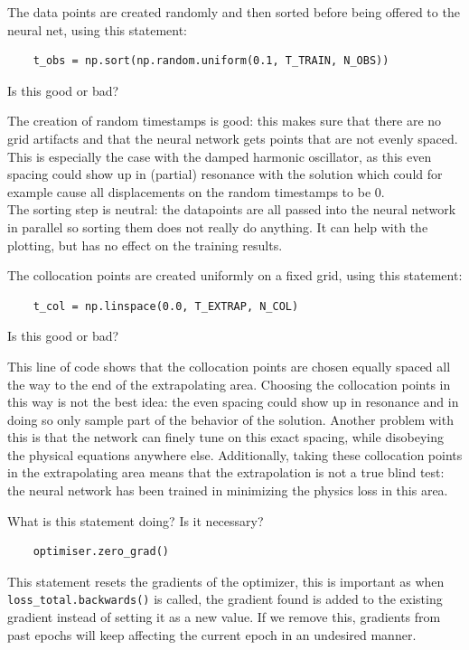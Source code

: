\documentclass[12pt, a4paper]{report}
\begin{document}
\begin{tcolorbox}[title=Code Question 3,sharp corners, colframe=black, colback=white]
    The data points are created randomly and then sorted before being offered to the neural net, using this statement:
    \begin{verbatim}
    t_obs = np.sort(np.random.uniform(0.1, T_TRAIN, N_OBS))
    \end{verbatim}
    Is this good or bad?
\end{tcolorbox}
The creation of random timestamps is good: this makes sure that there are no grid artifacts and that the neural network gets points that are not evenly spaced. This is especially the case with the damped harmonic oscillator, as this even spacing could show up in (partial) resonance with the solution which could for example cause all displacements on the random timestamps to be 0.\\
The sorting step is neutral: the datapoints are all passed into the neural network in parallel so sorting them does not really do anything. It can help with the plotting, but has no effect on the training results.\\

\begin{tcolorbox}[title=Code Question 4,sharp corners, colframe=black, colback=white]
    The collocation points are created uniformly on a fixed grid, using this statement:
    \begin{verbatim}
    t_col = np.linspace(0.0, T_EXTRAP, N_COL)
    \end{verbatim}
    Is this good or bad?
\end{tcolorbox}
This line of code shows that the collocation points are chosen equally spaced all the way to the end of the extrapolating area. Choosing the collocation points in this way is not the best idea: the even spacing could show up in resonance and in doing so only sample part of the behavior of the solution. Another problem with this is that the network can finely tune on this exact spacing, while disobeying the physical equations anywhere else. Additionally, taking these collocation points in the extrapolating area means that the extrapolation is not a true blind test: the neural network has been trained in minimizing the physics loss in this area.\\

\begin{tcolorbox}[title=Code Question 5,sharp corners, colframe=black, colback=white]
    What is this statement doing? Is it necessary?
    \begin{verbatim}
    optimiser.zero_grad()
    \end{verbatim}
\end{tcolorbox}
This statement resets the gradients of the optimizer, this is important as when \verb|loss_total.backwards()| is called, the gradient found is added to the existing gradient instead of setting it as a new value. If we remove this, gradients from past epochs will keep affecting the current epoch in an undesired manner. \\
\end{document}
